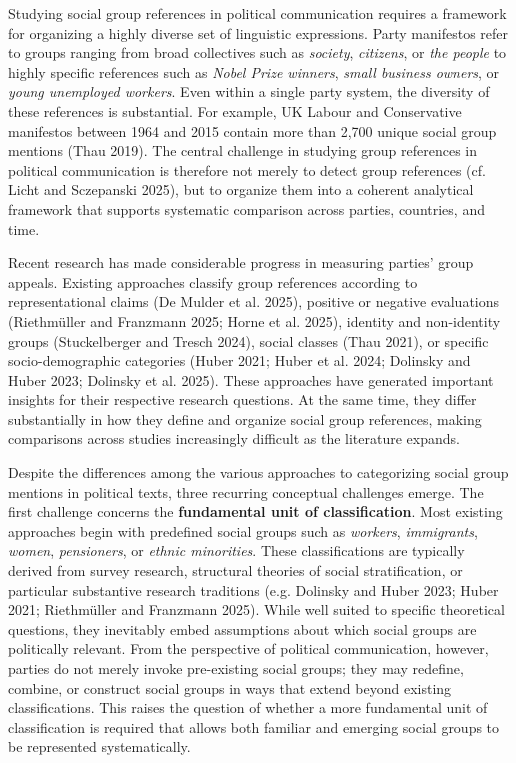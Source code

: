 \documentclass[12pt]{article}
\begin{document}
Studying social group references in political communication requires a framework for organizing a highly diverse set of linguistic expressions.
Party manifestos refer to groups ranging from broad collectives such as \emph{society}, \emph{citizens}, or \emph{the people} to highly specific references such as \emph{Nobel Prize winners}, \emph{small business owners}, or \emph{young unemployed workers}.
Even within a single party system, the diversity of these references is substantial.
For example, UK Labour and Conservative manifestos between 1964 and 2015 contain more than 2,700 unique social group mentions (Thau 2019).
The central challenge in studying group references in political communication is therefore not merely to detect group references (cf. Licht and Sczepanski 2025), but to organize them into a coherent analytical framework that supports systematic comparison across parties, countries, and time.

Recent research has made considerable progress in measuring parties' group appeals.
Existing approaches classify group references according to representational claims (De Mulder et al. 2025), positive or negative evaluations (Riethmüller and Franzmann 2025; Horne et al. 2025), identity and non-identity groups (Stuckelberger and Tresch 2024), social classes (Thau 2021), or specific socio-demographic categories (Huber 2021; Huber et al. 2024; Dolinsky and Huber 2023; Dolinsky et al. 2025).
These approaches have generated important insights for their respective research questions.
At the same time, they differ substantially in how they define and organize social group references, making comparisons across studies increasingly difficult as the literature expands.

Despite the differences among the various approaches to categorizing social group mentions in political texts, three recurring conceptual challenges emerge.
The first challenge concerns the \textbf{fundamental unit of classification}.
Most existing approaches begin with predefined social groups such as \emph{workers}, \emph{immigrants}, \emph{women}, \emph{pensioners}, or \emph{ethnic minorities}.
These classifications are typically derived from survey research, structural theories of social stratification, or particular substantive research traditions (e.g. Dolinsky and Huber 2023; Huber 2021; Riethmüller and Franzmann 2025).
While well suited to specific theoretical questions, they inevitably embed assumptions about which social groups are politically relevant.
From the perspective of political communication, however, parties do not merely invoke pre-existing social groups; they may redefine, combine, or construct social groups in ways that extend beyond existing classifications.
This raises the question of whether a more fundamental unit of classification is required that allows both familiar and emerging social groups to be represented systematically.
\end{document}
